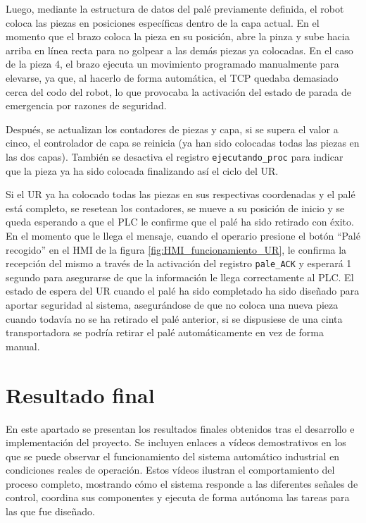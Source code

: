 Luego, mediante la estructura de datos del palé previamente definida, el robot coloca las piezas en posiciones específicas dentro de la capa actual. En el momento que el brazo coloca la pieza en su posición, abre la pinza y sube hacia arriba en línea recta para no golpear a las demás piezas ya colocadas. En el caso de la pieza 4, el brazo ejecuta un movimiento programado manualmente para elevarse, ya que, al hacerlo de forma automática, el TCP quedaba demasiado cerca del codo del robot, lo que provocaba la activación del estado de parada de emergencia por razones de seguridad.

Después, se actualizan los contadores de piezas y capa, si se supera el valor a cinco, el controlador de capa se reinicia (ya han sido colocadas todas las piezas en las dos capas). También se desactiva el registro \texttt{ejecutando\_proc} para indicar que la pieza ya ha sido colocada finalizando así el ciclo del UR.

Si el UR ya ha colocado todas las piezas en sus respectivas coordenadas y el palé está completo, se resetean los contadores, se mueve a su posición de inicio y se queda esperando a que el PLC le confirme que el palé ha sido retirado con éxito. En el momento que le llega el mensaje, cuando el operario presione el botón ``Palé recogido'' en el HMI de la figura \ref{fig:HMI_funcionamiento_UR}, le confirma la recepción del mismo a través de la activación del registro \texttt{pale\_ACK} y esperará 1 segundo para asegurarse de que la información le llega correctamente al PLC. El estado de espera del UR cuando el palé ha sido completado ha sido diseñado para aportar seguridad al sistema, asegurándose de que no coloca una nueva pieza cuando todavía no se ha retirado el palé anterior, si se dispusiese de una cinta transportadora se podría retirar el palé automáticamente en vez de forma manual. 

\section{Resultado final}
\label{sec:resultado_final}

En este apartado se presentan los resultados finales obtenidos tras el desarrollo e implementación del proyecto. Se incluyen enlaces a vídeos demostrativos en los que se puede observar el funcionamiento del sistema automático industrial en condiciones reales de operación. Estos vídeos ilustran el comportamiento del proceso completo, mostrando cómo el sistema responde a las diferentes señales de control, coordina sus componentes y ejecuta de forma autónoma las tareas para las que fue diseñado. 

